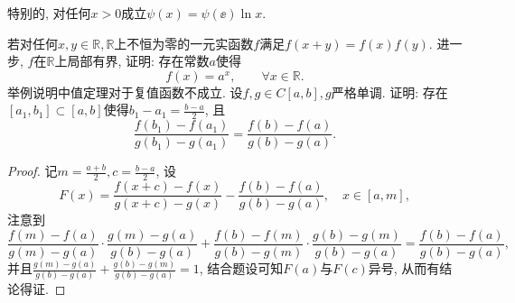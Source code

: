 \begin{quiza}
\begin{quizs}
特别的, 对任何\(x>0\)成立\(\psi(x)=\psi(\ee)\ln x.\)
\end{quizs}
\woe 若对任何\(x,y\in\mathbb{R},\mathbb{R}\)上不恒为零的一元实函数\(f\)满足\(f(x+y)=f(x)f(y)\). 进一步, \(f\)在\(\mathbb{R}\)上局部有界, 证明: 存在常数\(a\)使得\[f(x)=a^x,\qquad\forall x\in\mathbb{R}.\]
\woe 举例说明中值定理对于复值函数不成立.
\woe 设\(f,g\in C[a,b],g\)严格单调. 证明: 存在\([a_1,b_1]\subset [a,b]\)使得\(b_1-a_1=\frac{b-a}{2}\), 且\[\frac{f(b_1)-f(a_1)}{g(b_1)-g(a_1)}=\frac{f(b)-f(a)}{g(b)-g(a)}.\]
\begin{proof}
记\(m=\frac{a+b}{2},c=\frac{b-a}{2}\), 设\[F(x)=\frac{f(x+c)-f(x)}{g(x+c)-g(x)}-\frac{f(b)-f(a)}{g(b)-g(a)},\quad x\in[a,m],\]注意到\[\frac{f(m)-f(a)}{g(m)-g(a)}\cdot\frac{g(m)-g(a)}{g(b)-g(a)}+\frac{f(b)-f(m)}{g(b)-g(m)}\cdot\frac{g(b)-g(m)}{g(b)-g(a)}=\frac{f(b)-f(a)}{g(b)-g(a)},\]并且\(\frac{g(m)-g(a)}{g(b)-g(a)}+\frac{g(b)-g(m)}{g(b)-g(a)}=1\), 结合题设可知\(F(a)\)与\(F(c)\)异号, 从而有结论得证.
\end{proof}
\end{quiza}
